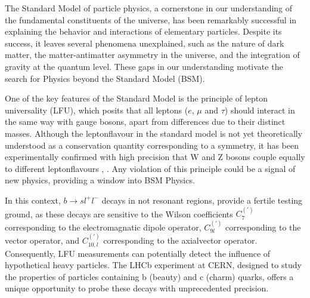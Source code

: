 The Standard Model of particle physics, a cornerstone in our 
understanding of the fundamental constituents of the universe, 
has been remarkably successful in explaining the behavior and 
interactions of elementary particles. Despite its success, it 
leaves several phenomena unexplained, such as the nature of dark 
matter, the matter-antimatter asymmetry in the universe, and the 
integration of gravity at the quantum level. These gaps in our 
understanding motivate the search for Physics beyond the Standard 
Model (BSM).

One of the key features of the Standard Model is the principle of 
lepton universality (LFU), which posits that all leptons ($e$, $\mu$ and $\tau$) 
should interact in the same way with gauge bosons, apart from differences 
due to their distinct masses. 
Although the leptonflavour in the standard model is not yet theoretically 
understood as a conservation quantity corresponding to a symmetry, 
it has been experimentally confirmed with high precision that W and Z 
bosons couple equally to different leptonflavours \cite{LU_CDF}, \cite{LU_ATLAS}.
Any violation of this principle could be 
a signal of new physics, providing a window into BSM Physics.

In this context, $b\to sl^+l^-$ decays in not resonant regions, provide a 
fertile testing ground, as these decays are sensitive to the Wilson 
coefficients $C_7^{(')}$ corresponding to the electromagnatic dipole operator, 
$C_{9l}^{(')}$ corresponding to the vector operator, and $C_{10,l}^{(')}$ corresponding 
to the axialvector operator. Consequently, LFU measurements can potentially detect 
the influence of hypothetical heavy particles. %
The LHCb experiment at CERN, designed to study the 
properties of particles containing b (beauty) and c (charm) quarks, offers 
a unique opportunity to probe these decays with unprecedented precision.